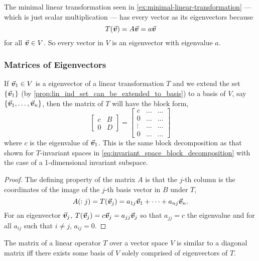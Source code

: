 \documentclass[../MathsNotesBase.tex]{subfiles}
\begin{document}
{\begin{exe}
{	 		}
 			\item{The minimal linear transformation seen in \ref{ex:minimal-linear-transformation} --- which is just scalar multiplication --- has every vector as its eigenvectors because
 				\[ T(\vec{\bm{v}}) = A\vec{\bm{v}} = a\vec{\bm{v}} \]
 				for all ${ \vec{\bm{v}} \in V }$. So every vector in $V$ is an eigenvector with eigenvalue $a$.
 			}\label{ex:eigenvectors-of-minimal-linear-transformations}
	 	\end{exe}
 	
 		\bigskip
 		\subsubsection{Matrices of Eigenvectors}
 		\bigskip
 		If ${ \vec{\bm{v}}_1 \in V }$ is a eigenvector of a linear transformation $T$ and we extend the set ${ \{\vec{\bm{v}}_1\} }$ (by \autoref{prop:lin_ind_set_can_be_extended_to_basis}) to a basis of $V$, say ${ \{\vec{\bm{v}}_1,\dots,\vec{\bm{v}}_n\} }$, then the matrix of $T$ will have the block form,
 		\[
 			\begin{bmatrix}
 			c & B\\
 			0 & D
 			\end{bmatrix} =
 			\begin{bmatrix}
 			c & \dots & \dots\\
 			0 & \dots & \dots\\
 			\vdots & \dots & \dots\\
 			0 & \dots & \dots
 			\end{bmatrix}
 		\]
 		where $c$ is the eigenvalue of $\vec{\bm{v}}_1$. This is the same block decomposition as that shown for $T$-invariant spaces in \ref{eq:invariant_space_block_decomposition} with the case of a 1-dimensional invariant subspace.
 		
 		\medskip
 		\begin{proof}
 			The defining property of the matrix $A$ is that the $j$-th column is the coordinates of the image of the $j$-th basis vector in $B$ under $T$,
 			\[ A(:j) = T(\vec{\bm{v}}_j) = a_{1j}\vec{\bm{v}}_1 + \cdots + a_{nj}\vec{\bm{v}}_n. \]
 			For an eigenvector $\vec{\bm{v}}_j$, ${ T(\vec{\bm{v}}_j) = c\vec{\bm{v}}_j = a_{jj}\vec{\bm{v}}_j }$ so that ${ a_{jj} = c }$ the eigenvalue and for all ${ a_{ij} }$ such that ${ i \neq j }$, ${ a_{ij} = 0 }$. 
 		\end{proof}
 		\begin{corollary}
 			\label{coro:diagonal-similar-matrix-iff-exists-basis-of-eigenvectors}
 			The matrix of a linear operator $T$ over a vector space $V$ is similar to a diagonal matrix iff there exists some basis of $V$ solely comprised of eigenvectors of $T$. 
 		\end{corollary}
 	
}
\end{document}
